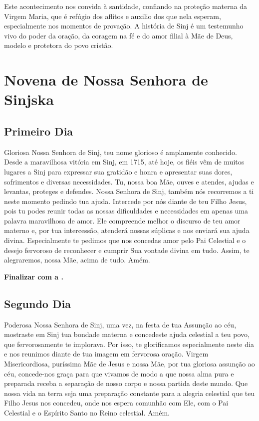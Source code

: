 \documentclass[a4paper,14pt]{extarticle} \usepackage[utf8]{inputenc}
\begin{document}
Este acontecimento nos convida à santidade, confiando na proteção materna da Virgem Maria, que é refúgio dos aflitos e auxilio dos que nela esperam, especialmente nos momentos de provação. A história de Sinj é um testemunho vivo do poder da oração, da coragem na fé e do amor filial à Mãe de Deus, modelo e protetora do povo cristão.



\newpage

\newpage

\section{Novena de Nossa Senhora de Sinjska}

\subsection{Primeiro Dia}

\noindent

Gloriosa Nossa Senhora de Sinj, teu nome glorioso é amplamente conhecido. Desde a maravilhosa vitória em Sinj, em 1715, até hoje, os fiéis vêm de muitos lugares a Sinj para expressar sua gratidão e honra e apresentar suas dores, sofrimentos e diversas necessidades. Tu, nossa boa Mãe, ouves e atendes, ajudas e levantas, proteges e defendes. Nossa Senhora de Sinj, também nós recorremos a ti neste momento pedindo tua ajuda. Intercede por nós diante de teu Filho Jesus, pois tu podes reunir todas as nossas dificuldades e necessidades em apenas uma palavra maravilhosa de amor. Ele compreende melhor o discurso de teu amor materno e, por tua intercessão, atenderá nossas súplicas e nos enviará sua ajuda divina. Especialmente te pedimos que nos concedas amor pelo Pai Celestial e o desejo fervoroso de reconhecer e cumprir Sua vontade divina em tudo. Assim, te alegraremos, nossa Mãe, acima de tudo.
Amém.


\noindent
\textbf{Finalizar com a .}


\subsection{Segundo Dia}

Poderosa Nossa Senhora de Sinj, uma vez, na festa de tua Assunção ao céu, mostraste em Sinj tua bondade materna e concedeste ajuda celestial a teu povo, que fervorosamente te implorava. Por isso, te glorificamos especialmente neste dia e nos reunimos diante de tua imagem em fervorosa oração. Virgem Misericordiosa, puríssima Mãe de Jesus e nossa Mãe, por tua gloriosa assunção ao céu, concede-nos graça para que vivamos de modo a que nossa alma pura e preparada receba a separação de nosso corpo e nossa partida deste mundo. Que nossa vida na terra seja uma preparação constante para a alegria celestial que teu Filho Jesus nos concedeu, onde nos espera comunhão com Ele, com o Pai Celestial e o Espírito Santo no Reino celestial. Amém.
\end{document}
